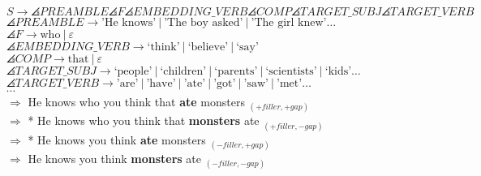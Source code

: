 \\
\\
$S \rightarrow \angles{PREAMBLE} \angles{F} \angles{EMBEDDING\_VERB} \angles{COMP} \angles{TARGET\_SUBJ} \angles{TARGET\_VERB}$
\\
$\angles{PREAMBLE} \rightarrow \text{'He knows'}\ |\ \text{'The boy asked'}\ |\ \text{'The girl knew'} \ldots
$
\\
$\angles{F} \rightarrow \text{who}\ |\ \varepsilon$
\\
$\angles{EMBEDDING\_VERB} \rightarrow \text{`think'}\ |\ \text{`believe'}\ |\ \text{`say'}$
\\
$\angles{COMP} \rightarrow \text{that}\ |\ \varepsilon$
\\
$\angles{TARGET\_SUBJ} \rightarrow \text{`people'}\ |\ \text{`children'}\ |\ \text{`parents'}\ |\ \text{`scientists'}\ |\ \text{`kids'} \ldots$  
\\
$\angles{TARGET\_VERB} \rightarrow \text{'are'}\ |\ \text{'have'}\ |\ \text{'ate'}\ |\ \text{'got'}\ |\ \text{'saw'}\ |\ \text{'met'} \ldots$
\\
$\cdots$
\\


$\Rightarrow$ He knows who you think that \textbf{ate}
monsters $_{(+filler, +gap)}$
\\
$\Rightarrow$ * He knows who you think that \textbf{monsters} ate $_{(+filler, -gap)}$
\\
$\Rightarrow$ * He knows you think \textbf{ate} monsters $_{(-filler, +gap)}$
\\
$\Rightarrow$ He knows you think \textbf{monsters} ate $_{(-filler, -gap)}$
\\
\\
\hline
\hline
